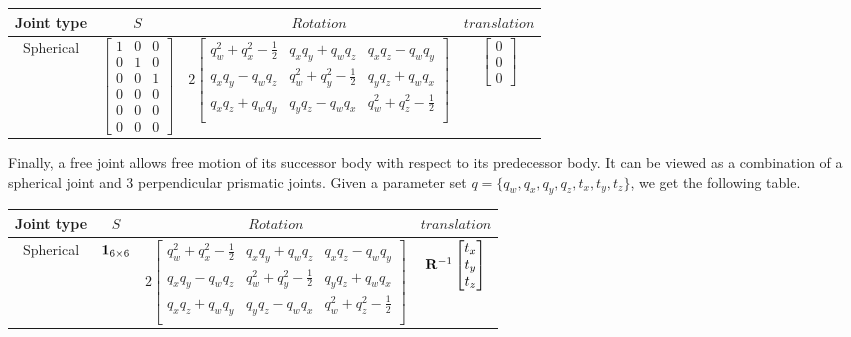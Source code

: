 \begin{table}[ht]
  \centering
  \begin{tabular}{cccc}
    \toprule
    Joint type & $S$ & $Rotation$ & $translation$ \\
    \midrule
    Spherical
    &
    $\begin{bmatrix}
      1 & 0 & 0 \\ 0 & 1 & 0 \\ 0 & 0 & 1 \\ 0 & 0 & 0 \\ 0 & 0 & 0 \\ 0 & 0 & 0
    \end{bmatrix}$
    &
    $2 \begin{bmatrix}
      q_w^2 +q_x^2-\frac{1}{2} & q_x q_y + q_w q_z & q_x q_z - q_w q_y \\
      q_x q_y - q_w q_z & q_w^2 +q_y^2-\frac{1}{2} & q_y q_z + q_w q_x \\
      q_x q_z + q_w q_y & q_y q_z - q_w q_x & q_w^2 +q_z^2-\frac{1}{2} \\
    \end{bmatrix}$
    &
    $\begin{bmatrix}
      0 \\ 0 \\ 0
    \end{bmatrix}$
    \\
    \bottomrule
  \end{tabular}
\end{table}

Finally, a free joint allows free motion of its successor body with respect to its predecessor body.
It can be viewed as a combination of a spherical joint and 3 perpendicular prismatic joints.
Given a parameter set $q = \{ q_w, q_x, q_y, q_z, t_x, t_y, t_z\}$, we get the following table.

\begin{tabular}{cccc}
  \toprule
  Joint type & $S$ & $Rotation$ & $translation$ \\
  \midrule
  Spherical
  &
  ${\bf 1}_{6\times 6}$
  &
  $2 \begin{bmatrix}
    q_w^2 +q_x^2-\frac{1}{2} & q_x q_y + q_w q_z & q_x q_z - q_w q_y \\
    q_x q_y - q_w q_z & q_w^2 +q_y^2-\frac{1}{2} & q_y q_z + q_w q_x \\
    q_x q_z + q_w q_y & q_y q_z - q_w q_x & q_w^2 +q_z^2-\frac{1}{2} \\
  \end{bmatrix}$
  &
  ${\bf R}^{-1}\begin{bmatrix}
    t_x \\ t_y \\ t_z
  \end{bmatrix}$
  \\
  \bottomrule
\end{tabular}



